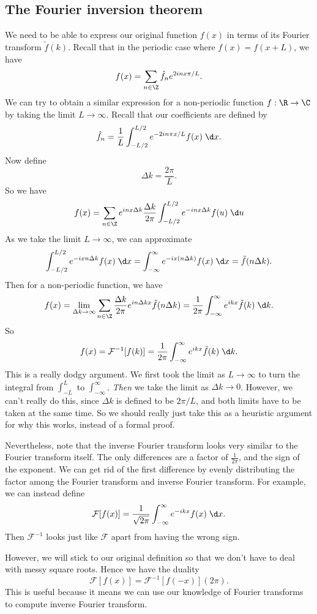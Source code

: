 \documentclass[a4paper]{article}
\begin{document}
\subsection{The Fourier inversion theorem}
We need to be able to express our original function $f(x)$ in terms of its Fourier transform $\tilde{f}(k)$. Recall that in the periodic case where $f(x) = f(x + L)$, we have
\[
  f(x) = \sum_{n \in \Z}\hat{f}_n e^{2inx\pi /L}.
\]
We can try to obtain a similar expression for a non-periodic function $f: \R \to \C$ by taking the limit $L \to \infty$. Recall that our coefficients are defined by
\[
  \hat{f}_n = \frac{1}{L} \int_{-L/2}^{L/2} e^{-2 in\pi x/L} f(x)\;\d x.
\]
Now define
\[
  \Delta k = \frac{2\pi }{L}.
\]
So we have
\[
  f(x) = \sum_{n \in \Z} e^{inx \Delta k} \frac{\Delta k}{2 \pi}\int_{-L/2}^{L/2} e^{-inx \Delta k} f(u) \;\d u
\]
As we take the limit $L \to \infty$, we can approximate
\[
  \int_{-L/2}^{L/2} e^{-ixn\Delta k} f(x) \;\d x = \int_{-\infty}^\infty e^{-ix (n \Delta k)} f(x)\;\d x = \tilde{f}(n \Delta k).
\]
Then for a non-periodic function, we have
\[
  f(x) = \lim_{\Delta k \to \infty} \sum_{n \in \Z} \frac{\Delta k}{2\pi} e^{in \Delta k x} \tilde{f} (n \Delta k) = \frac{1}{2\pi} \int_{-\infty}^\infty e^{ik x} \tilde{f}(k) \;\d k.
\]
So
\[
  f(x) = \mathcal{F}^{-1}[f(k)] = \frac{1}{2\pi} \int_{-\infty}^\infty e^{ik x} \tilde{f}(k) \;\d k.
\]
This is a really dodgy argument. We first took the limit as $L \to \infty$ to turn the integral from $\int_{-L}^L$ to $\int_{-\infty}^\infty$. \emph{Then} we take the limit as $\Delta k \to 0$. However, we can't really do this, since $\Delta k$ is defined to be $2\pi /L$, and both limits have to be taken at the same time. So we should really just take this as a heuristic argument for why this works, instead of a formal proof.

Nevertheless, note that the inverse Fourier transform looks very similar to the Fourier transform itself. The only differences are a factor of $\frac{1}{2\pi}$, and the sign of the exponent. We can get rid of the first difference by evenly distributing the factor among the Fourier transform and inverse Fourier transform. For example, we can instead define
\[
  \mathcal{F}[f(x)] = \frac{1}{\sqrt{2\pi}} \int_{-\infty}^\infty e^{-ikx} f(x)\;\d x.
\]
Then $\mathcal{F}^{-1}$ looks just like $\mathcal{F}$ apart from having the wrong sign.

However, we will stick to our original definition so that we don't have to deal with messy square roots. Hence we have the duality
\[
  \mathcal{F}[f(x)] = \mathcal{F}^{-1}[f(-x)] (2\pi).
\]
This is useful because it means we can use our knowledge of Fourier transforms to compute inverse Fourier transform.
\end{document}
